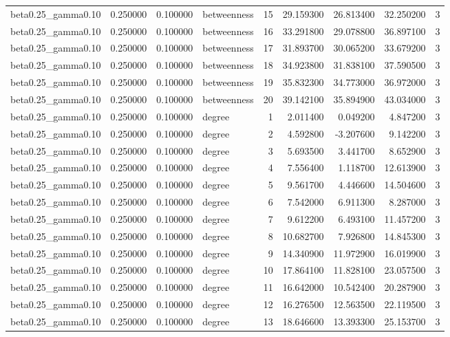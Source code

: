 \begin{tabular}{lrrlrrrrr}
beta0.25\_gamma0.10 & 0.250000 & 0.100000 & betweenness & 15 & 29.159300 & 26.813400 & 32.250200 & 3 \\
beta0.25\_gamma0.10 & 0.250000 & 0.100000 & betweenness & 16 & 33.291800 & 29.078800 & 36.897100 & 3 \\
beta0.25\_gamma0.10 & 0.250000 & 0.100000 & betweenness & 17 & 31.893700 & 30.065200 & 33.679200 & 3 \\
beta0.25\_gamma0.10 & 0.250000 & 0.100000 & betweenness & 18 & 34.923800 & 31.838100 & 37.590500 & 3 \\
beta0.25\_gamma0.10 & 0.250000 & 0.100000 & betweenness & 19 & 35.832300 & 34.773000 & 36.972000 & 3 \\
beta0.25\_gamma0.10 & 0.250000 & 0.100000 & betweenness & 20 & 39.142100 & 35.894900 & 43.034000 & 3 \\
beta0.25\_gamma0.10 & 0.250000 & 0.100000 & degree & 1 & 2.011400 & 0.049200 & 4.847200 & 3 \\
beta0.25\_gamma0.10 & 0.250000 & 0.100000 & degree & 2 & 4.592800 & -3.207600 & 9.142200 & 3 \\
beta0.25\_gamma0.10 & 0.250000 & 0.100000 & degree & 3 & 5.693500 & 3.441700 & 8.652900 & 3 \\
beta0.25\_gamma0.10 & 0.250000 & 0.100000 & degree & 4 & 7.556400 & 1.118700 & 12.613900 & 3 \\
beta0.25\_gamma0.10 & 0.250000 & 0.100000 & degree & 5 & 9.561700 & 4.446600 & 14.504600 & 3 \\
beta0.25\_gamma0.10 & 0.250000 & 0.100000 & degree & 6 & 7.542000 & 6.911300 & 8.287000 & 3 \\
beta0.25\_gamma0.10 & 0.250000 & 0.100000 & degree & 7 & 9.612200 & 6.493100 & 11.457200 & 3 \\
beta0.25\_gamma0.10 & 0.250000 & 0.100000 & degree & 8 & 10.682700 & 7.926800 & 14.845300 & 3 \\
beta0.25\_gamma0.10 & 0.250000 & 0.100000 & degree & 9 & 14.340900 & 11.972900 & 16.019900 & 3 \\
beta0.25\_gamma0.10 & 0.250000 & 0.100000 & degree & 10 & 17.864100 & 11.828100 & 23.057500 & 3 \\
beta0.25\_gamma0.10 & 0.250000 & 0.100000 & degree & 11 & 16.642000 & 10.542400 & 20.287900 & 3 \\
beta0.25\_gamma0.10 & 0.250000 & 0.100000 & degree & 12 & 16.276500 & 12.563500 & 22.119500 & 3 \\
beta0.25\_gamma0.10 & 0.250000 & 0.100000 & degree & 13 & 18.646600 & 13.393300 & 25.153700 & 3 \\

\end{tabular}
